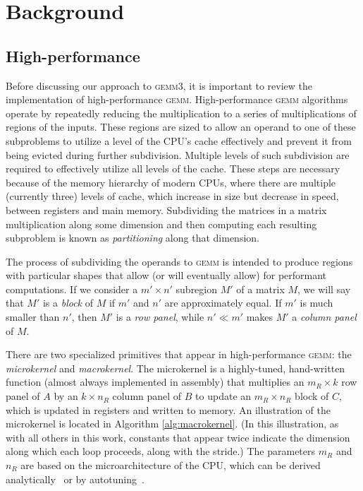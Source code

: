 \documentclass[12pt]{article}
\newcommand*{\gemmt}{{\textsc{gemm3}}}
\newcommand*{\gemm}{{\textsc{gemm}}}
\newcommand*{\mycite}[1]{~\cite{#1}}
\begin{document}
\section{Background}
\subsection{High-performance {\cmunicode \gemm{}}}
Before discussing our approach to \gemmt{}, it is important to review the implementation of high-performance \gemm{}.
High-performance \gemm{} algorithms operate by repeatedly reducing the multiplication to a series of multiplications of regions of the inputs.
These regions are sized to allow an operand to one of these subproblems to utilize a level of the CPU's cache effectively and prevent it from being evicted during further subdivision.
Multiple levels of such subdivision are required to effectively utilize all levels of the cache.
These steps are necessary because of the memory hierarchy of modern CPUs, where there are multiple (currently three) levels of cache, which increase in size but decrease in speed, between registers and main memory.
Subdividing the matrices in a matrix multiplication along some dimension and then computing each resulting subproblem is known as \emph{partitioning} along that dimension.

The process of subdividing the operands to \gemm{} is intended to produce regions with particular shapes that allow (or will eventually allow) for performant computations.
If we consider a $m' \times n'$ subregion $M'$ of a matrix $M$, we will say that $M'$ is a \emph{block} of $M$ if $m'$ and $n'$ are approximately equal.
If $m'$ is much smaller than $n'$, then $M'$ is a \emph{row panel}, while $n' \ll m'$ makes $M'$ a \emph{column panel} of $M$.

There are two specialized primitives that appear in high-performance \gemm{}: the \emph{microkernel} and \emph{macrokernel}.
The microkernel is a highly-tuned, hand-written function (almost always implemented in assembly) that multiplies an $m_R \times k$ row panel of $A$ by an $k \times n_R$ column panel of $B$ to update an $m_R \times n_R$ block of $C$, which is updated in registers and written to memory.
An illustration of the microkernel is located in Algorithm \ref{alg:macrokernel}.
(In this illustration, as with all others in this work, constants that appear twice indicate the dimension along which each loop proceeds, along with the stride.)
The parameters $m_R$ and $n_R$ are based on the microarchitecture of the CPU, which can be derived analytically\mycite{Low2016} or by autotuning\mycite{Whaley1998}.
\end{document}

